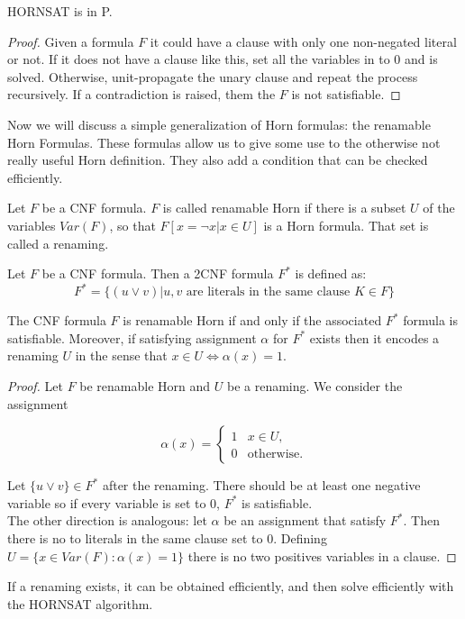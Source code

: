 \begin{proposition}
  HORNSAT is in P.
\end{proposition}
\begin{proof}
  Given a formula $F$ it could have a clause with only one non-negated literal or not. If it does not have a clause like this, set all the variables in to 0 and is solved. Otherwise, unit-propagate the unary clause and repeat the process recursively. If a contradiction is raised, them the $F$ is not satisfiable.
\end{proof}


Now we will discuss a simple generalization of Horn formulas: the renamable Horn Formulas. These formulas allow us to give some use to the otherwise not really useful Horn definition. They also add a condition that can be checked efficiently.

\begin{definition}
  Let $F$ be a CNF formula. $F$ is called renamable Horn if there is a subset $U$ of the variables $Var(F)$, so that $F[x=\neg x | x \in U]$ is a Horn formula.
  That set is called a renaming.
\end{definition}


\begin{definition}
  Let $F$ be a CNF formula. Then a 2CNF formula $F^*$ is defined as:
  $$F^* = \{(u \vee v) | u,v \text{ are literals in the same clause } K \in F \}$$
\end{definition}


\begin{theorem}
  The CNF formula $F$ is renamable Horn if and only if the associated $F^*$ formula is satisfiable. Moreover, if satisfying assignment $\alpha$ for $F^*$  exists then it encodes a renaming $U$ in the sense that $x \in U \iff \alpha(x) = 1$.
\end{theorem}
\begin{proof}
  Let $F$ be renamable Horn and $U$ be a renaming. We consider the assignment

$$
\alpha(x)= 
\begin{cases}
1 & x \in U,\\
0 & \text{otherwise}.
\end{cases}
$$
 
  Let $\{u\vee v\} \in F^*$ after the renaming. There should be at least one negative variable so if every variable is set to 0, $F^*$ is satisfiable.\\

  The other direction is analogous: let $\alpha$ be an assignment that satisfy $F^*$. Then there is no to literals in the same clause set to 0. Defining $U=  \{x \in Var(F) : \alpha(x) = 1\}$ there is no two positives variables in a clause.
  \end{proof}


If a renaming exists, it can be obtained efficiently, and then solve efficiently with the HORNSAT algorithm.






